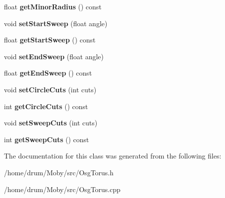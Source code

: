 \begin{DoxyCompactItemize}
\item 
float {\bfseries get\-Minor\-Radius} () const \label{classosg_1_1OsgTorus_ab83c02747957a245f17c4e5756f18054}

\item 
void {\bfseries set\-Start\-Sweep} (float angle)\label{classosg_1_1OsgTorus_afbd60e210e8a88464e505cf63cdb31ce}

\item 
float {\bfseries get\-Start\-Sweep} () const \label{classosg_1_1OsgTorus_ae2c0e6f29f8b36caeea5553149ff0d9b}

\item 
void {\bfseries set\-End\-Sweep} (float angle)\label{classosg_1_1OsgTorus_a8116e35bd3dcedc8cc021c5396ea1136}

\item 
float {\bfseries get\-End\-Sweep} () const \label{classosg_1_1OsgTorus_a0ff2ee8495ea4f9c8d42362430d746a6}

\item 
void {\bfseries set\-Circle\-Cuts} (int cuts)\label{classosg_1_1OsgTorus_a1f587ce2a5d8afa4b0ce0769219d21a4}

\item 
int {\bfseries get\-Circle\-Cuts} () const \label{classosg_1_1OsgTorus_a3df2d359cdb61a6fe8be7a2e759a6c10}

\item 
void {\bfseries set\-Sweep\-Cuts} (int cuts)\label{classosg_1_1OsgTorus_af3a98ebc372399393131d42d7d82c25b}

\item 
int {\bfseries get\-Sweep\-Cuts} () const \label{classosg_1_1OsgTorus_ad46769d293629f45cab343c3ca62e4bc}

\end{DoxyCompactItemize}


The documentation for this class was generated from the following files\-:\begin{DoxyCompactItemize}
\item 
/home/drum/\-Moby/src/Osg\-Torus.\-h\item 
/home/drum/\-Moby/src/Osg\-Torus.\-cpp\end{DoxyCompactItemize}
